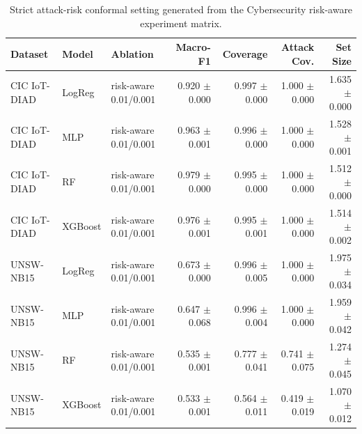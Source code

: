\begin{table}[t]
\centering
\scriptsize
\setlength{\tabcolsep}{3pt}
\begin{tabular}{@{}lllrrrr@{}}
\toprule
Dataset & Model & Ablation & Macro-F1 & Coverage & Attack Cov. & Set Size \\
\midrule
CIC IoT-DIAD & LogReg & risk-aware 0.01/0.001 & 0.920 $\pm$ 0.000 & 0.997 $\pm$ 0.000 & 1.000 $\pm$ 0.000 & 1.635 $\pm$ 0.000 \\
CIC IoT-DIAD & MLP & risk-aware 0.01/0.001 & 0.963 $\pm$ 0.001 & 0.996 $\pm$ 0.000 & 1.000 $\pm$ 0.000 & 1.528 $\pm$ 0.001 \\
CIC IoT-DIAD & RF & risk-aware 0.01/0.001 & 0.979 $\pm$ 0.000 & 0.995 $\pm$ 0.000 & 1.000 $\pm$ 0.000 & 1.512 $\pm$ 0.000 \\
CIC IoT-DIAD & XGBoost & risk-aware 0.01/0.001 & 0.976 $\pm$ 0.001 & 0.995 $\pm$ 0.001 & 1.000 $\pm$ 0.000 & 1.514 $\pm$ 0.002 \\
UNSW-NB15 & LogReg & risk-aware 0.01/0.001 & 0.673 $\pm$ 0.000 & 0.996 $\pm$ 0.005 & 1.000 $\pm$ 0.000 & 1.975 $\pm$ 0.034 \\
UNSW-NB15 & MLP & risk-aware 0.01/0.001 & 0.647 $\pm$ 0.068 & 0.996 $\pm$ 0.004 & 1.000 $\pm$ 0.000 & 1.959 $\pm$ 0.042 \\
UNSW-NB15 & RF & risk-aware 0.01/0.001 & 0.535 $\pm$ 0.001 & 0.777 $\pm$ 0.041 & 0.741 $\pm$ 0.075 & 1.274 $\pm$ 0.045 \\
UNSW-NB15 & XGBoost & risk-aware 0.01/0.001 & 0.533 $\pm$ 0.001 & 0.564 $\pm$ 0.011 & 0.419 $\pm$ 0.019 & 1.070 $\pm$ 0.012 \\
\bottomrule
\end{tabular}
\caption{Strict attack-risk conformal setting generated from the Cybersecurity risk-aware experiment matrix.}
\label{tab:risk-aware-strict}
\end{table}

